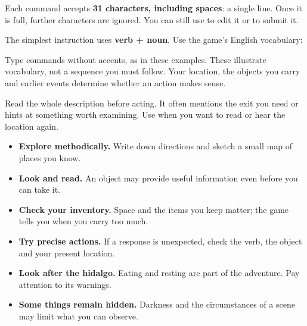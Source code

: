 Each command accepts \textbf{31 characters, including spaces}: a single line. Once it is full, further characters are ignored. You can still use  to edit it or  to submit it.

The simplest instruction uses \textbf{verb + noun}. Use the game's English vocabulary:
\begin{quote}
\par
{}\par
{}\par
{}
\end{quote}
Type commands without accents, as in these examples. These illustrate vocabulary, not a sequence you must follow. Your location, the objects you carry and earlier events determine whether an action makes sense.



Read the whole description before acting. It often mentions the exit you need or hints at something worth examining. Use  when you want to read or hear the location again.

\begin{itemize}
\item \textbf{Explore methodically.} Write down directions and sketch a small map of places you know.
\item \textbf{Look and read.} An object may provide useful information even before you can take it.
\item \textbf{Check your inventory.} Space and the items you keep matter; the game tells you when you carry too much.
\item \textbf{Try precise actions.} If a response is unexpected, check the verb, the object and your present location.
\item \textbf{Look after the hidalgo.} Eating and resting are part of the adventure. Pay attention to its warnings.
\item \textbf{Some things remain hidden.} Darkness and the circumstances of a scene may limit what you can observe.
\end{itemize}

\begin{center}\end{center}

